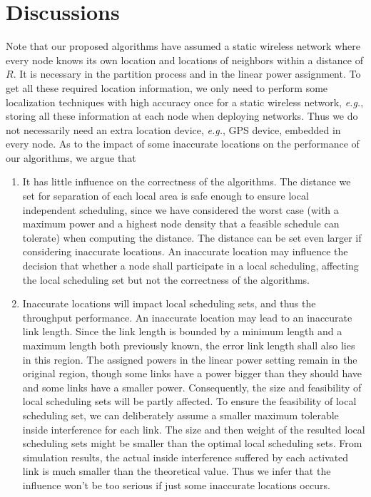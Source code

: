 \documentclass[journal]{IEEEtran}
\begin{document}
\section{Discussions}

Note that our proposed algorithms have assumed a  static wireless network where every node knows its own location and locations of neighbors within a distance of $R$. It is necessary in the partition process and in the linear power assignment. To get all these required location information, we only need to perform some localization techniques with high accuracy once for a static wireless network, \emph{e.g.}, storing all these information at each node when deploying  networks. Thus we do not necessarily need an extra location device, \emph{e.g.}, GPS device, embedded in every node. As to the impact of some inaccurate locations on the performance of our algorithms, we argue that
\begin{enumerate}
  \item It has little influence on the correctness of the algorithms. The distance we set for separation of each local area is safe enough to ensure local independent scheduling, since we have considered the worst case (with a maximum power and a highest node density that a feasible schedule can tolerate) when computing the distance. The distance can be set even larger if considering inaccurate locations.  An inaccurate location may influence the decision that whether a node shall participate in a local scheduling, affecting the local scheduling set but not the correctness of the algorithms.
  \item Inaccurate locations will impact local scheduling sets, and thus the throughput performance. An inaccurate location may lead to an inaccurate link length. Since the link length is bounded by  a minimum length and a maximum length both previously known, the error link length shall also lies in this region. The assigned powers in the linear power setting remain in the original region, though some links have a power bigger than they should have and some links have a smaller power.
     Consequently, the size and feasibility of local scheduling sets will be partly affected. To ensure the feasibility of local scheduling set, we can deliberately assume a smaller maximum tolerable inside interference  for each link.  The size and then weight of the resulted local scheduling sets might be smaller than the optimal local scheduling sets. From simulation results, the actual inside interference suffered by each activated link is much smaller than the theoretical value. Thus we infer that the influence won't be too serious if just some inaccurate locations occurs.
\end{enumerate}
\end{document}
